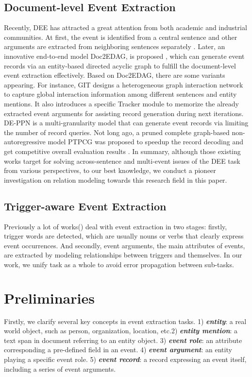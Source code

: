 \documentclass[11pt]{article}
\begin{document}
\subsection{Document-level Event Extraction}

Recently, DEE has attracted a great attention from both academic and industrial communities. At first, the event is identified from a central sentence and other arguments are extracted from neighboring sentences separately \cite{DCFEE}. Later, an innovative end-to-end model Doc2EDAG, is proposed \cite{Doc2EDAG}, which can generate event records via an entity-based directed acyclic graph to fulfill the document-level event extraction effectively. Based on Doc2EDAG, there are some variants appearing. For instance, GIT \cite{GIT} designs a heterogeneous graph interaction network to capture global interaction information among different sentences and entity mentions.  It also introduces a specific Tracker module to memorize the already extracted event arguments for assisting record generation during next iterations. DE-PPN \cite{DE-PPN} is a multi-granularity model that can generate event records via limiting the number of record queries. Not long ago, a pruned complete graph-based non-autoregressive model PTPCG was proposed to speedup the record decoding and get competitive overall evaluation results \cite{PTPCG}. In summary, although those existing works target for solving across-sentence and multi-event issues of the DEE task from various perspectives, to our best knowledge, we conduct a pioneer investigation on relation modeling towards this research field in this paper.

\subsection{Trigger-aware Event Extraction}
Previously a lot of works(\citep{Heng-see, Shasha-see, Qi-see, Yubo-see, Thien-see, Xiao-see}) deal with event extraction in two stages: firstly, trigger words are detected, which are usually nouns or verbs that clearly express event occurrences. And secondly, event arguments, the main attributes of events, are extracted by modeling relationships between triggers and themselves. In our work, we unify task as a whole to avoid error propagation between sub-tasks.




\section{Preliminaries}
Firstly, we clarify several key concepts in event extraction tasks. 1) \textit{\textbf{entity}}: a real world object, such as person, organization, location, etc.2) \textit{\textbf{entity mention}}: a text span in document referring to an entity object. 3) \textit{\textbf{event role}}: an attribute corresponding a pre-defined field in an event. 4) \textit{\textbf{event argument}}: an entity playing a specific event role. 5) \textit{\textbf{event record}}: a record expressing an event itself, including a series of event arguments.
\end{document}
